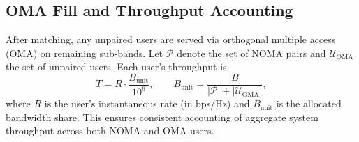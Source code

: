 \subsection{OMA Fill and Throughput Accounting}
After matching, any unpaired users are served via orthogonal multiple access (OMA) on remaining sub-bands.  
Let $\mathcal{P}$ denote the set of NOMA pairs and $\mathcal{U}_{\text{OMA}}$ the set of unpaired users.  
Each user’s throughput is
\[
T = R \cdot \frac{B_{\text{unit}}}{10^6}, \qquad 
B_{\text{unit}} = \frac{B}{|\mathcal{P}| + |\mathcal{U}_{\text{OMA}}|},
\]
where $R$ is the user’s instantaneous rate (in bps/Hz) and $B_{\text{unit}}$ is the allocated bandwidth share.  
This ensures consistent accounting of aggregate system throughput across both NOMA and OMA users.
